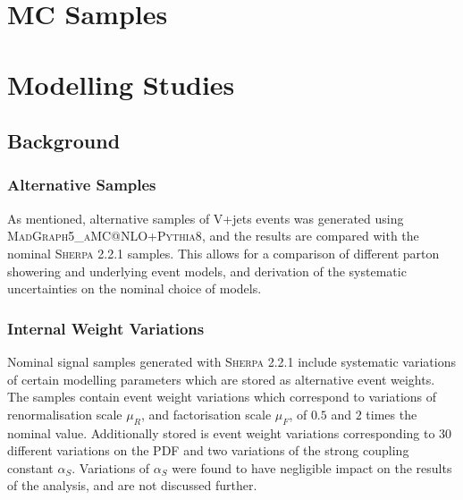 \section{MC Samples}
%

\section{Modelling Studies}\label{sec:vhbb_modelling}

\subsection{Background}
%

%
\subsubsection{Alternative Samples}
As mentioned, alternative samples of V+jets events was generated using \textsc{MadGraph5\_aMC@NLO+Pythia8}, and the results are compared with the nominal \textsc{Sherpa 2.2.1} samples. This allows for a comparison of different parton showering and underlying event models, and derivation of the systematic uncertainties on the nominal choice of models.

\subsubsection{Internal Weight Variations}
Nominal signal samples generated with \textsc{Sherpa 2.2.1} include systematic variations of certain modelling parameters which are stored as alternative event weights. The samples contain event weight variations which correspond to variations of renormalisation scale $\mu_R$, and factorisation scale $\mu_F$, of $0.5$ and $2$ times the nominal value. Additionally stored is event weight variations corresponding to $30$ different variations on the PDF and two variations of the strong coupling constant $\alpha_S$. Variations of $\alpha_S$ were found to have negligible impact on the results of the analysis, and are not discussed further. 

